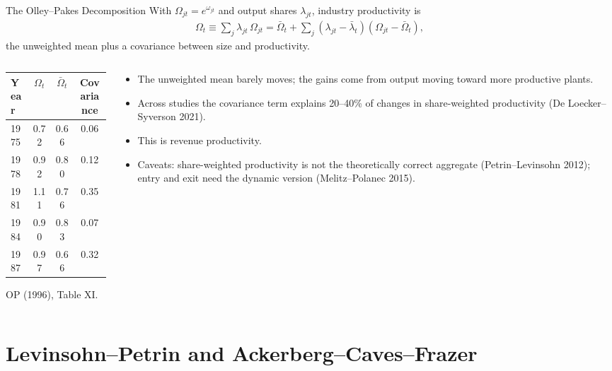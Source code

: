 \documentclass[aspectratio=169,10pt]{beamer}
\begin{document}
\begin{frame}{The Olley--Pakes Decomposition}
\small
With $\Omega_{jt} = e^{\omega_{jt}}$ and output shares $\lambda_{jt}$, industry productivity is
\begin{align*}
\Omega_t \equiv \sum_j \lambda_{jt}\,\Omega_{jt} = \bar\Omega_t + \sum_j (\lambda_{jt} - \bar\lambda_t)(\Omega_{jt} - \bar\Omega_t),
\end{align*}
the unweighted mean plus a covariance between size and productivity.
\begin{columns}[T]
\begin{column}{0.42\textwidth}
\begin{center}
\scriptsize
\begin{tabular}{lccc}
\toprule
Year & $\Omega_t$ & $\bar\Omega_t$ & Covariance \\
\midrule
1975 & 0.72 & 0.66 & 0.06 \\
1978 & 0.92 & 0.80 & 0.12 \\
1981 & 1.11 & 0.76 & 0.35 \\
1984 & 0.90 & 0.83 & 0.07 \\
1987 & 0.97 & 0.66 & 0.32 \\
\bottomrule
\end{tabular}

{\tiny OP (1996), Table XI.}
\end{center}
\end{column}
\begin{column}{0.56\textwidth}
\begin{itemize}
\item The unweighted mean barely moves; the gains come from output moving toward more productive plants.
\item Across studies the covariance term explains 20--40\% of changes in share-weighted productivity (De Loecker--Syverson 2021).
\item This is revenue productivity.
\item Caveats: share-weighted productivity is not the theoretically correct aggregate (Petrin--Levinsohn 2012); entry and exit need the dynamic version (Melitz--Polanec 2015).
\end{itemize}
\end{column}
\end{columns}
\end{frame}


\section{Levinsohn--Petrin and Ackerberg--Caves--Frazer}
\end{document}
